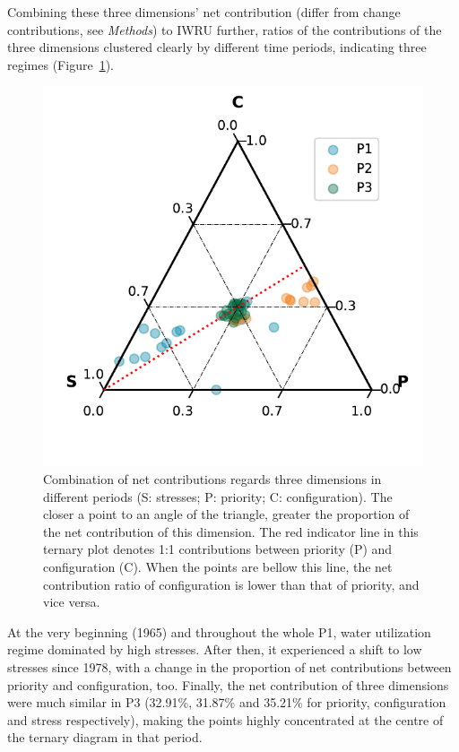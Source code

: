 \documentclass[9pt, twocolumn, twoside, lineno]{pnas-new}
\begin{document}
Combining these three dimensions' net contribution (differ from change contributions, see \textit{Methods}) to IWRU further, ratios of the contributions of the three dimensions clustered clearly by different time periods, indicating three regimes (Figure~\ref{fig:phases}).
\begin{figure}%
	\centering
	\includegraphics[width=0.9\linewidth]{../../figures/main/phases.pdf}
	\caption{Combination of net contributions regards three dimensions in different periods (S: stresses; P: priority; C: configuration). The closer a point to an angle of the triangle, greater the proportion of the net contribution of this dimension.
	The red indicator line in this ternary plot denotes 1:1 contributions between priority (P) and configuration (C). When the points are bellow this line, the net contribution ratio of configuration is lower than that of priority, and vice versa.}
	\label{fig:phases}
\end{figure}
At the very beginning (1965) and throughout the whole P1, water utilization regime dominated by high stresses. After then, it experienced a shift to low stresses since 1978, with a change in the proportion of net contributions between priority and configuration, too.
Finally, the net contribution of three dimensions were much similar in P3 (32.91\%, 31.87\% and 35.21\% for priority, configuration and stress respectively), making the points highly concentrated at the centre of the ternary diagram in that period.
\end{document}
